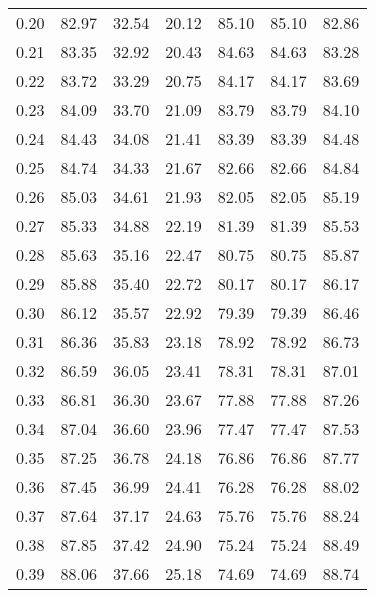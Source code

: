 \begin{tabular}{|c|c|c|c|c|c|c|}
      0.20 &     82.97 &     32.54 &      20.12 &   85.10 &      85.10 &         82.86 \\
      0.21 &     83.35 &     32.92 &      20.43 &   84.63 &      84.63 &         83.28 \\
      0.22 &     83.72 &     33.29 &      20.75 &   84.17 &      84.17 &         83.69 \\
      0.23 &     84.09 &     33.70 &      21.09 &   83.79 &      83.79 &         84.10 \\
      0.24 &     84.43 &     34.08 &      21.41 &   83.39 &      83.39 &         84.48 \\
      0.25 &     84.74 &     34.33 &      21.67 &   82.66 &      82.66 &         84.84 \\
      0.26 &     85.03 &     34.61 &      21.93 &   82.05 &      82.05 &         85.19 \\
      0.27 &     85.33 &     34.88 &      22.19 &   81.39 &      81.39 &         85.53 \\
      0.28 &     85.63 &     35.16 &      22.47 &   80.75 &      80.75 &         85.87 \\
      0.29 &     85.88 &     35.40 &      22.72 &   80.17 &      80.17 &         86.17 \\
      0.30 &     86.12 &     35.57 &      22.92 &   79.39 &      79.39 &         86.46 \\
      0.31 &     86.36 &     35.83 &      23.18 &   78.92 &      78.92 &         86.73 \\
      0.32 &     86.59 &     36.05 &      23.41 &   78.31 &      78.31 &         87.01 \\
      0.33 &     86.81 &     36.30 &      23.67 &   77.88 &      77.88 &         87.26 \\
      0.34 &     87.04 &     36.60 &      23.96 &   77.47 &      77.47 &         87.53 \\
      0.35 &     87.25 &     36.78 &      24.18 &   76.86 &      76.86 &         87.77 \\
      0.36 &     87.45 &     36.99 &      24.41 &   76.28 &      76.28 &         88.02 \\
      0.37 &     87.64 &     37.17 &      24.63 &   75.76 &      75.76 &         88.24 \\
      0.38 &     87.85 &     37.42 &      24.90 &   75.24 &      75.24 &         88.49 \\
      0.39 &     88.06 &     37.66 &      25.18 &   74.69 &      74.69 &         88.74 \\

\end{tabular}
